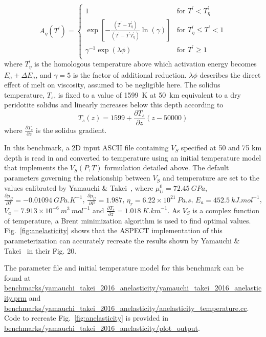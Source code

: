 \documentclass{article}
\newcommand{\aspect}{\textsc{ASPECT}}
\begin{document}
\begin{equation}
A_\eta(T^{\prime}) = 
\begin{cases}
1  & \text{for } T^{\prime} < T^{\prime}_{\eta} \\
\exp \left[-\frac{(T^{\prime}-T^{\prime}_{\eta})}{(T^{\prime}-T^{\prime}T^{\prime}_{\eta})} \ln(\gamma)\right]& \text{for }T^{\prime}_{\eta} \leq T^{\prime} < 1 \\
\gamma^{-1} \exp(\lambda\phi) & \text{for }T^{\prime} \geq 1\\
\end{cases}
\end{equation}
where $T^{\prime}_\eta$ is the homologous temperature above which activation energy becomes $E_a + \Delta E_a$, and $\gamma = 5$ is the factor of additional reduction. $\lambda\phi$ describes the direct effect of melt on viscosity, assumed to be negligible here. The solidus temperature, $T_s$, is fixed to a value of 1599~K at 50~km equivalent to a dry peridotite solidus \cite{Hirsch2000} and linearly increases below this depth according to
\begin{equation}
T_{s}(z) = 1599 + \frac {\partial T_s}{\partial z} (z - 50000)
\label{eq:Ts}
\end{equation}
where $\frac {\partial T_s}{\partial z}$ is the solidus gradient. 

In this benchmark, a 2D input ASCII file containing $V_S$ specified at 50 and 75 km depth is read in and converted to temperature using an initial temperature model that implements the $V_{S}(P,T)$ formulation detailed above. The default parameters governing the relationship between $V_S$ and temperature are set to the values calibrated by Yamauchi \& Takei~\cite{YT16}, where $\mu_U^0 = 72.45~\si{GPa}$, $\frac{\partial{\mu_U}}{\partial{T}} = -0.01094~\si{GPa . K}^{-1}$, $\frac{\partial{\mu_U}}{\partial{P}} = 1.987$,  $\eta_r = 6.22 \times 10^{21}~\si{Pa . s}$, $E_a = 452.5~\si{kJ . mol}^{-1}$, $V_a = 7.913 \times 10^{-6}~\si{m}^{3}~\si{mol}^{-1}$ and $\frac{\partial T_s}{\partial z} = 1.018~\si{K . km}^{-1}$. As $V_S$ is a complex function of temperature, a Brent minimization algorithm is used to find optimal values. Fig.~\ref{fig:anelasticity} shows that the \aspect{} implementation of this parameterization can accurately recreate the results shown by Yamauchi \& Takei~\cite{YT16} in their Fig. 20.

The parameter file and initial temperature model for this benchmark can be found at \url{benchmarks/yamauchi_takei_2016_anelasticity/yamauchi_takei_2016_anelasticity.prm} and \url{benchmarks/yamauchi_takei_2016_anelasticity/anelasticity_temperature.cc}. Code to recreate  Fig.~\ref{fig:anelasticity}  is provided in \url{benchmarks/yamauchi_takei_2016_anelasticity/plot_output}.
\end{document}
